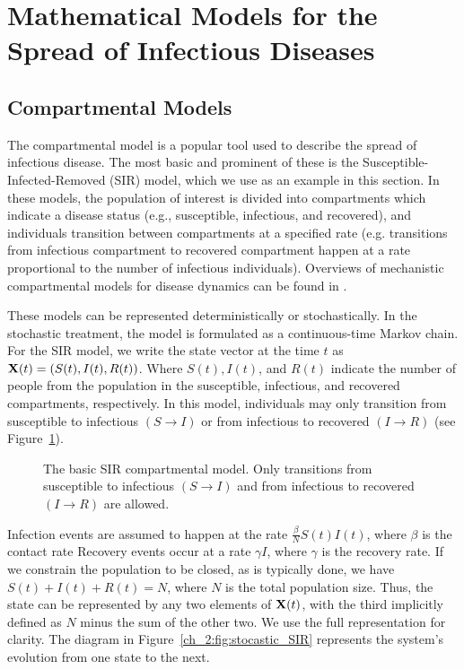 \section{Mathematical Models for the Spread of Infectious Diseases}
\label{sec:math_models}

\subsection{Compartmental Models}

The compartmental model is a popular tool used to describe the spread of infectious disease.
The most basic and prominent of these is the Susceptible-Infected-Removed (SIR) model, which we use as an example in this section.
In these models, the population of interest is divided into compartments which indicate a disease status (e.g., susceptible, infectious, and recovered), and individuals transition between compartments at a specified rate
(e.g. transitions from infectious compartment to recovered compartment happen at a rate proportional to the number of infectious individuals).
Overviews of mechanistic compartmental models for disease dynamics can be found in \citet{anderson1992infectious, Brauer2008, keeling2011modeling, 10.1093/aje/kww021}.

These models can be represented deterministically or stochastically.
In the stochastic treatment, the model is formulated as a continuous-time Markov chain.
For the SIR model, we write the state vector at the time \( t \) as \( \mathbf{X}(t) = (S(t), I(t), R(t)) \).
Where \( S(t), I(t) \), and \( R(t) \) indicate the number of people from the population in the susceptible, infectious, and recovered compartments, respectively.
In this model, individuals may only transition from susceptible to infectious \( (S \to I) \) or from infectious to recovered \( (I \to R) \) (see Figure~\ref{fig:ch_2:SIR_diagram}).
\begin{figure}
    \centering
    \caption[The basic SIR compartmental model.]{The basic SIR compartmental model.
    Only transitions from susceptible to infectious \( (S \to I) \) and from infectious to recovered \( (I \to R) \) are allowed.}
    \label{fig:ch_2:SIR_diagram}
\end{figure}
Infection events are assumed to happen at the rate \( \frac{\beta}{N} S(t) I(t) \), where \( \beta \) is the contact rate
Recovery events occur at a rate \( \gamma I \), where \( \gamma \) is the recovery rate.
If we constrain the population to be closed, as is typically done, we have \(  S(t) + I(t) + R(t) = N \), where \( N \) is the total population size.
Thus, the state can be represented by any two elements of \( \mathbf{X} (t) \), with the third implicitly defined as \( N \) minus the sum of the other two.
We use the full representation for clarity.
The diagram in Figure~\ref{ch_2:fig:stocastic_SIR} represents the system's evolution from one state to the next.

